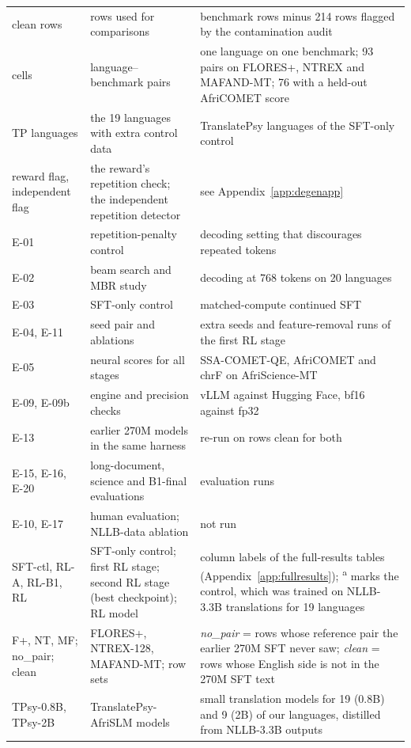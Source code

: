\begin{table}[h]
\begin{tabularx}{\linewidth}{@{}>{\raggedright\arraybackslash}p{3.6cm}>{\raggedright\arraybackslash}p{3.6cm}X@{}}
clean rows & rows used for comparisons & benchmark rows minus 214 rows flagged by the contamination audit\\
cells & language--benchmark pairs & one language on one benchmark; 93 pairs on FLORES+, NTREX and MAFAND-MT; 76 with a held-out AfriCOMET score\\
TP languages & the 19 languages with extra control data & TranslatePsy languages of the SFT-only control\\
reward flag, independent flag & the reward's repetition check; the independent repetition detector & see Appendix~\ref{app:degenapp}\\
E-01 & repetition-penalty control & decoding setting that discourages repeated tokens\\
E-02 & beam search and MBR study & decoding at 768 tokens on 20 languages\\
E-03 & SFT-only control & matched-compute continued SFT\\
E-04, E-11 & seed pair and ablations & extra seeds and feature-removal runs of the first RL stage\\
E-05 & neural scores for all stages & SSA-COMET-QE, AfriCOMET and chrF on AfriScience-MT\\
E-09, E-09b & engine and precision checks & vLLM against Hugging Face, bf16 against fp32\\
E-13 & earlier 270M models in the same harness & re-run on rows clean for both\\
E-15, E-16, E-20 & long-document, science and B1-final evaluations & evaluation runs\\
E-10, E-17 & human evaluation; NLLB-data ablation & not run\\
SFT-ctl, RL-A, RL-B1, RL & SFT-only control; first RL stage; second RL stage (best checkpoint); RL model & column labels of the full-results tables (Appendix~\ref{app:fullresults}); \textsuperscript{a} marks the control, which was trained on NLLB-3.3B translations for 19 languages\\
F+, NT, MF; no\_pair; clean & FLORES+, NTREX-128, MAFAND-MT; row sets & \emph{no\_pair} = rows whose reference pair the earlier 270M SFT never saw; \emph{clean} = rows whose English side is not in the 270M SFT text\\
TPsy-0.8B, TPsy-2B & TranslatePsy-AfriSLM models & small translation models for 19 (0.8B) and 9 (2B) of our languages, distilled from NLLB-3.3B outputs\\
\bottomrule
\end{tabularx}
\end{table}


